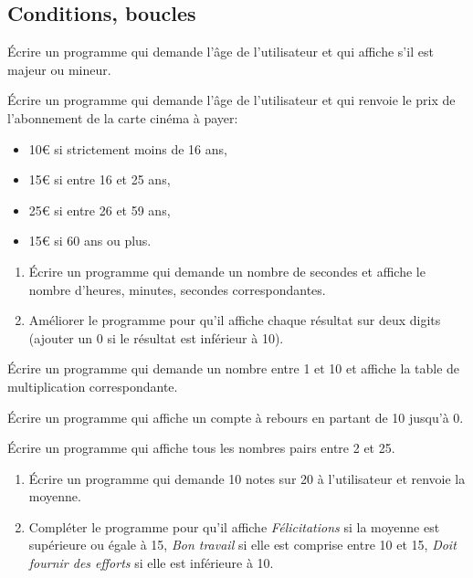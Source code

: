 \documentclass[a4paper,11pt]{article}
\begin{document}
\begin{Form}
\section{Conditions, boucles}
\begin{exo}
Écrire un programme qui demande l'âge de l'utilisateur et qui affiche s'il est majeur ou mineur.
\end{exo}
\begin{exo}
Écrire un programme qui demande l'âge de l'utilisateur et qui renvoie le prix de l'abonnement de la carte cinéma à payer:
\begin{itemize}
\item 10€ si strictement moins de 16 ans,
\item 15€ si entre 16 et 25 ans,
\item 25€ si entre 26 et 59 ans,
\item 15€ si 60 ans ou plus.
\end{itemize}
\end{exo}
\begin{exo}
\begin{enumerate}
\item Écrire un programme qui demande un nombre de secondes et affiche le nombre d'heures, minutes, secondes correspondantes.
\item Améliorer le programme pour qu'il affiche chaque résultat sur deux digits (ajouter un 0 si le résultat est inférieur à 10).
\end{enumerate}
\end{exo}
\begin{exo}
Écrire un programme qui demande un nombre entre 1 et 10 et affiche la table de multiplication correspondante.
\end{exo}
\begin{exo}
Écrire un programme qui affiche un compte à rebours en partant de 10 jusqu'à 0.
\end{exo}
\begin{exo}
Écrire un programme qui affiche tous les nombres pairs entre 2 et 25.
\end{exo}
\begin{exo}
\begin{enumerate}
\item Écrire un programme qui demande 10 notes sur 20 à l'utilisateur et renvoie la moyenne.
\item Compléter le programme pour qu'il affiche \emph{Félicitations} si la moyenne est supérieure ou égale à 15, \emph{Bon travail} si elle est comprise entre 10 et 15, \emph{Doit fournir des efforts} si elle est inférieure à 10.

\end{enumerate}
\end{exo}
\end{Form}
\end{document}
